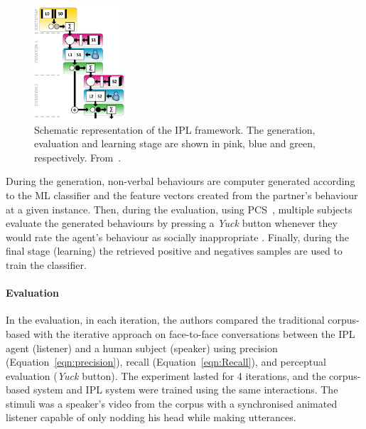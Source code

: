 \begin{figure}
	\centering
	\includegraphics[width=0.3\textwidth]{images/IPL_system.png}
	\caption{Schematic representation of the \ac{IPL} framework. The generation, evaluation and learning stage are shown in pink, blue and green, respectively. From~\cite{Kok2012}.}
	\label{fig:ipl_system}
\end{figure}


During the generation, non-verbal behaviours are computer generated according to the \ac{ML} classifier and the feature vectors created from the partner's behaviour at a given instance. Then, during the evaluation, using \ac{PCS}~\cite{Huang2010}, multiple subjects evaluate the generated behaviours by pressing a \textit{Yuck} button whenever they would rate the agent's behaviour as socially inappropriate \cite{Poppe2011}. Finally, during the final stage (learning) the retrieved positive and negatives samples are used to train the classifier.

\paragraph{\textbf{Evaluation}}

In the evaluation, in each iteration, the authors compared the traditional corpus-based with the iterative approach on face-to-face conversations between the \ac{IPL} agent (listener) and a human subject (speaker) using precision (Equation~\ref{eqn:precision}), recall (Equation~\ref{eqn:Recall}), and perceptual evaluation (\textit{Yuck} button). The experiment lasted for 4 iterations, and the corpus-based system and \ac{IPL} system were trained using the same interactions. The stimuli was a speaker's video from the corpus with a synchronised animated listener capable of only nodding his head while making utterances. 

